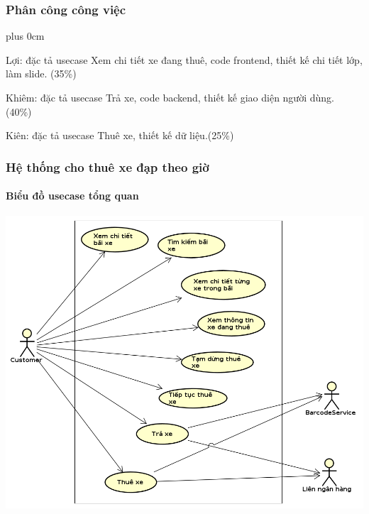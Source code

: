 \documentclass[11pt]{beamer}
\renewcommand{\raggedright}{\leftskip=0pt \rightskip=0pt plus 0cm}
\let\olditemize=\itemize
\renewenvironment{itemize}{\olditemize\raggedright}{\endlist}
\begin{document}
\begin{frame}[plain]
	\maketitle
\end{frame}
\begin{frame}[plain]
	\frametitle{Phân công công việc}
	\begin{itemize}
		\item Lợi: đặc tả usecase Xem chi tiết xe đang thuê, code frontend, thiết kế chi tiết lớp, làm slide. (35\%)
		\item Khiêm: đặc tả usecase Trả xe, code backend, thiết kế giao diện người dùng. (40\%)
		\item Kiên: đặc tả usecase Thuê xe, thiết kế dữ liệu.(25\%)
	\end{itemize}
\end{frame}
\begin{frame}[plain]
	\frametitle{Hệ thống cho thuê xe đạp theo giờ}
	\framesubtitle{Biểu đồ usecase tổng quan}
	\includegraphics[scale=.35]{Images/Overview.png}
\end{frame}
\end{document}

